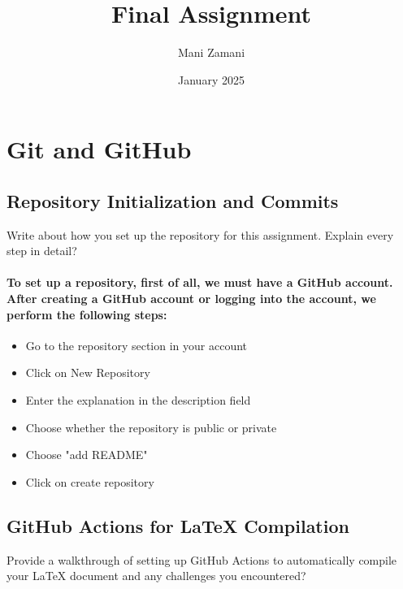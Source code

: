 \documentclass[11pt]{article}
\title{Final Assignment}
\author{Mani Zamani}
\date{January 2025}
\begin{document}
\maketitle
\newpage
\tableofcontents
\newpage

\section{Git and GitHub}
\subsection{Repository Initialization and Commits}

Write about how you set up the repository for this assignment. Explain every
 step in detail?

\paragraph{To set up a repository, first of all, we must have a GitHub account. After creating a GitHub account or logging into the account, we perform the following steps:}

\begin{itemize}
    \item Go to the repository section in your account
    \item Click on New Repository
    \item Enter the explanation in the description field
    \item Choose whether the repository is public or private
    \item Choose "add README"
    \item Click on create repository 
\end{itemize}

\subsection{GitHub Actions for LaTeX Compilation}
Provide a walkthrough of setting up GitHub Actions to automatically compile
 your LaTeX document and any challenges you encountered?\newline

\end{document}
